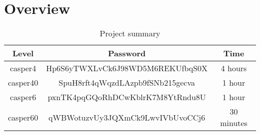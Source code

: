 \section{Overview}
\begin{table}[h]
	\centering
	\begin{tabular}{|c|c|c|}
		\hline
		\textbf{Level} & \textbf{Password} 								& \textbf{Time} \\ \hline
		casper4        & Hp6S6yTWXLvCk6J98WD5M6REKUfbqS0X               & 4 hours       \\ \hline
		casper40       & SpuH8rft4qWqzdLAzpb9fSNb215gecva				& 1 hour        \\ \hline
		casper6        & pxnTK4pqGQoRhDCwKblrK7M8YtRndu8U				& 1 hour        \\ \hline
		casper60       & qWBWotuzvUy3JQXmCk9LwvIVbUvoCCj6				& 30 minutes    \\ \hline
	\end{tabular}
	\caption{Project summary}
	\label{tbl:summary}
\end{table}